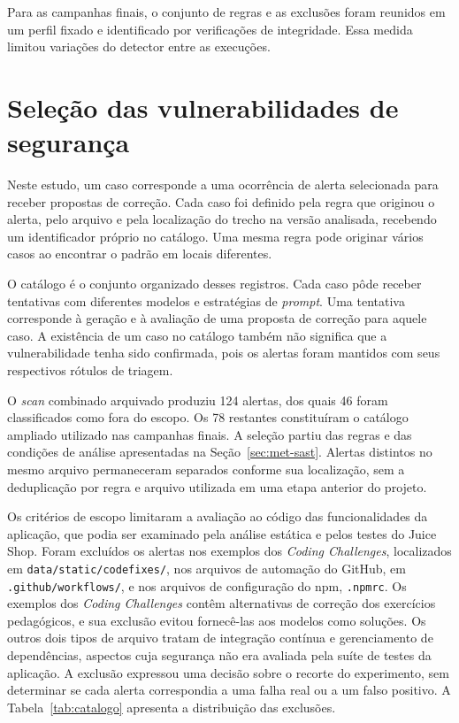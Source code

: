 Para as campanhas finais, o conjunto de regras e as exclusões foram reunidos em um perfil fixado e identificado por verificações de integridade. Essa medida limitou variações do detector entre as execuções.

\section{Seleção das vulnerabilidades de segurança}
\label{sec:met-selecao}

Neste estudo, um caso corresponde a uma ocorrência de alerta selecionada para receber propostas de correção. Cada caso foi definido pela regra que originou o alerta, pelo arquivo e pela localização do trecho na versão analisada, recebendo um identificador próprio no catálogo. Uma mesma regra pode originar vários casos ao encontrar o padrão em locais diferentes.

O catálogo é o conjunto organizado desses registros. Cada caso pôde receber tentativas com diferentes modelos e estratégias de \textit{prompt}. Uma tentativa corresponde à geração e à avaliação de uma proposta de correção para aquele caso. A existência de um caso no catálogo também não significa que a vulnerabilidade tenha sido confirmada, pois os alertas foram mantidos com seus respectivos rótulos de triagem.

O \textit{scan} combinado arquivado produziu 124 alertas, dos quais 46 foram classificados como fora do escopo. Os 78 restantes constituíram o catálogo ampliado utilizado nas campanhas finais. A seleção partiu das regras e das condições de análise apresentadas na Seção~\ref{sec:met-sast}. Alertas distintos no mesmo arquivo permaneceram separados conforme sua localização, sem a deduplicação por regra e arquivo utilizada em uma etapa anterior do projeto.

Os critérios de escopo limitaram a avaliação ao código das funcionalidades da aplicação, que podia ser examinado pela análise estática e pelos testes do Juice Shop. Foram excluídos os alertas nos exemplos dos \textit{Coding Challenges}, localizados em \texttt{data/\allowbreak static/\allowbreak codefixes/\allowbreak }, nos arquivos de automação do GitHub, em \texttt{.\allowbreak github/\allowbreak workflows/\allowbreak }, e nos arquivos de configuração do npm, \texttt{.\allowbreak npmrc}. Os exemplos dos \textit{Coding Challenges} contêm alternativas de correção dos exercícios pedagógicos, e sua exclusão evitou fornecê-las aos modelos como soluções. Os outros dois tipos de arquivo tratam de integração contínua e gerenciamento de dependências, aspectos cuja segurança não era avaliada pela suíte de testes da aplicação. A exclusão expressou uma decisão sobre o recorte do experimento, sem determinar se cada alerta correspondia a uma falha real ou a um falso positivo. A Tabela~\ref{tab:catalogo} apresenta a distribuição das exclusões.

